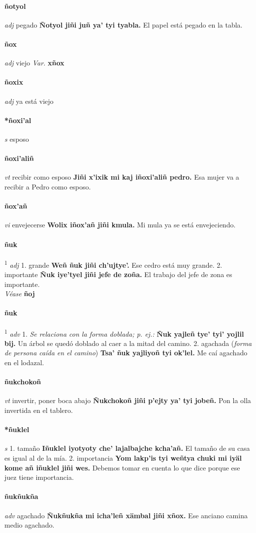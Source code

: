 \documentclass{scrbook}
\newcommand{\entry}[1]{\paragraph{#1}}
\newcommand{\onedefinition}[1]{#1.}
\newcommand{\defsuperscript}[1]{\textsuperscript{1}}
\newcommand{\nontranslationdef}[1]{\textit{#1}}
\newcommand{\partofspeech}[1]{\textit{#1}}
\newcommand{\spanishtranslation}[1]{#1}
\newcommand{\clarification}[1]{(\textit{#1})}
\newcommand{\cholexample}[1]{\textbf{#1}}
\newcommand{\exampletranslation}[1]{#1}
\newcommand{\alsosee}[1]{\\\textit{Véase} \textbf{#1}}
\newcommand{\variation}[1]{\textit{Var.} \textbf{#1}}
\begin{document}
\begin{multicols}{2}
\entry{ñotyol}
\partofspeech{adj}
\spanishtranslation{pegado}
\cholexample{Ñotyol jiñi juñ ya' tyi tyabla.}
\exampletranslation{El papel está pegado en la tabla.}

\entry{ñox}
\partofspeech{adj}
\spanishtranslation{viejo}
\variation{xñox}

\entry{ñoxix}
\partofspeech{adj}
\spanishtranslation{ya está viejo}

\entry{*ñoxi'al}
\partofspeech{s}
\spanishtranslation{esposo}

\entry{ñoxi'aliñ}
\partofspeech{vt}
\spanishtranslation{recibir como esposo}
\cholexample{Jiñi x'ixik mi kaj iñoxi'aliñ pedro.}
\exampletranslation{Esa mujer va a recibir a Pedro como esposo.}

\entry{ñox'añ}
\partofspeech{vi}
\spanishtranslation{envejecerse}
\cholexample{Wolix iñox'añ jiñi kmula.}
\exampletranslation{Mi mula ya se está envejeciendo.}

\entry{ñuk}
\defsuperscript{1}
\partofspeech{adj}
\onedefinition{1}
\spanishtranslation{grande}
\cholexample{Weñ ñuk jiñi ch'ujtye'.}
\exampletranslation{Ese cedro está muy grande.}
\onedefinition{2}
\spanishtranslation{importante}
\cholexample{Ñuk iye'tyel jiñi jefe de zoña.}
\exampletranslation{El trabajo del jefe de zona es importante.}
\alsosee{ñoj}

\entry{ñuk}
\defsuperscript{2}
\partofspeech{adv}
\onedefinition{1}
\nontranslationdef{Se relaciona con la forma doblada; p. ej.:}
\cholexample{Ñuk yajleñ tye' tyi' yojlil bij.}
\exampletranslation{Un árbol se quedó doblado al caer a la mitad del camino.}
\onedefinition{2}
\spanishtranslation{agachada}
\clarification{forma de persona caída en el camino}
\cholexample{Tsa' ñuk yajliyoñ tyi ok'lel.}
\exampletranslation{Me caí agachado en el lodazal.}

\entry{ñukchokoñ}
\partofspeech{vt}
\spanishtranslation{invertir, poner boca abajo}
\cholexample{Ñukchokoñ jiñi p'ejty ya' tyi jobeñ.}
\exampletranslation{Pon la olla invertida en el tablero.}

\entry{*ñuklel}
\partofspeech{s}
\onedefinition{1}
\spanishtranslation{tamaño}
\cholexample{Iñuklel iyotyoty che' lajalbajche kcha'añ.}
\exampletranslation{El tamaño de su casa es igual al de la mía.}
\onedefinition{2}
\spanishtranslation{importancia}
\cholexample{Yom lakp'is tyi weñtya chuki mi iyäl kome añ iñuklel jiñi wes.}
\exampletranslation{Debemos tomar en cuenta lo que dice porque ese juez tiene importancia.}

\entry{ñukñukña}
\partofspeech{adv}
\spanishtranslation{agachado}
\cholexample{Ñukñukña mi icha'leñ xämbal jiñi xñox.}
\exampletranslation{Ese anciano camina medio agachado.}


\end{multicols}
\end{document}
